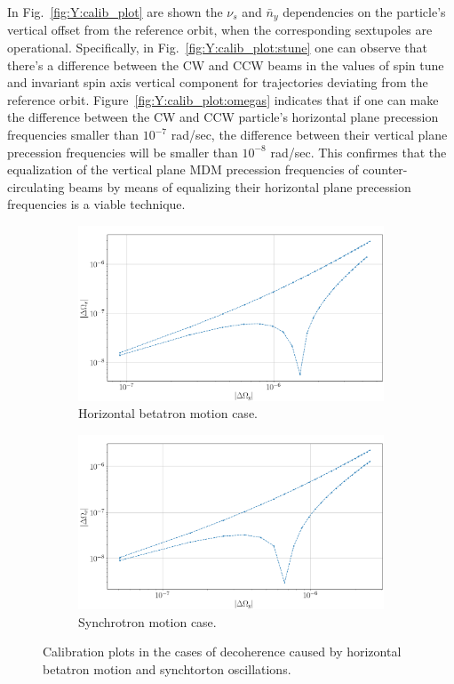 \documentclass[a4paper]{jacow}
\newcommand{\nbar}{\bar n}
\begin{document}
In Fig.~\ref{fig:Y:calib_plot} are shown the $\nu_s$ and $\nbar_y$ dependencies on the particle's
vertical offset from the reference orbit, when the corresponding sextupoles are operational. Specifically, in
Fig.~\ref{fig:Y:calib_plot:stune} one can observe that there's a difference between the CW and CCW beams
in the values of spin tune and invariant spin axis vertical component for trajectories
deviating from the reference orbit. Figure~\ref{fig:Y:calib_plot:omegas} indicates that if one can make the
difference between the CW and CCW particle's horizontal plane precession frequencies
smaller than $10^{-7}$ rad/sec,
the difference between their vertical plane precession frequencies will be smaller than $10^{-8}$ rad/sec.
This confirmes that the equalization of the vertical plane MDM precession frequencies of counter-circulating
beams by means of equalizing their horizontal plane precession frequencies is a viable technique.

\begin{figure}[h]
  \centering
  \begin{subfigure}{\linewidth}
    \includegraphics[width=\linewidth]{../img/IPAC19/GFF_omegas_range_X}
    \caption{Horizontal betatron motion case.\label{fig:X:calib_plot:omegas}}
  \end{subfigure}
  \begin{subfigure}{\linewidth}
    \includegraphics[width=\linewidth]{../img/IPAC19/GFF_omegas_range_D}
    \caption{Synchrotron motion case.\label{fig:D:calib_plot:omegas}}
  \end{subfigure}
  \caption{Calibration plots in the cases of decoherence caused by horizontal betatron motion
    and synchtorton oscillations.\label{fig:calib_plot:omegas}}
\end{figure}
\end{document}
